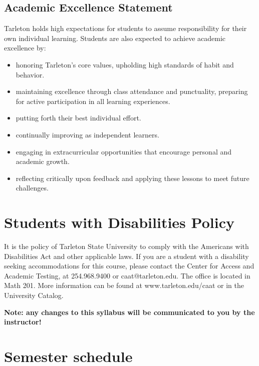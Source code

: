 \documentclass[10pt]{article}
\begin{document}
\subsection*{Academic Excellence Statement}
\label{sec:org05fa78d}
Tarleton holds high expectations for students to assume responsibility for their own individual learning. Students are also expected to achieve academic excellence by:
\begin{itemize}
\item honoring Tarleton’s core values, upholding high standards of habit and behavior.
\item maintaining excellence through class attendance and punctuality, preparing for active participation in all learning experiences.
\item putting forth their best individual effort.
\item continually improving as independent learners.
\item engaging in extracurricular opportunities that encourage personal and academic growth.
\item reflecting critically upon feedback and applying these lessons to meet future challenges.
\end{itemize}

\section*{Students with Disabilities Policy}
\label{sec:orga421ac4}

It is the policy of Tarleton State University to comply with the Americans with Disabilities Act and other applicable laws. If you are a student with a disability seeking accommodations for this course, please contact the Center for Access and Academic Testing, at 254.968.9400 or caat@tarleton.edu. The office is located in Math 201. More information can be found at www.tarleton.edu/caat or in the University Catalog.

\textbf{\textbf{Note:  any changes to this syllabus will be communicated to you by the instructor!}}

\section*{Semester schedule}
\label{sec:org7631cbe}
\end{document}
